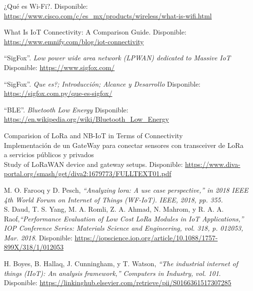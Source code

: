 \begin{references}
    ¿Qué es Wi-Fi?. Disponible:
    \url{https://www.cisco.com/c/es_mx/products/wireless/what-is-wifi.html}

    What Is IoT Connectivity: A Comparison Guide. Disponible:
    \url{https://www.emnify.com/blog/iot-connectivity}

    “SigFox”. \textit{Low power wide area network (LPWAN) dedicated to Massive IoT} Disponible: \url{https://www.sigfox.com/}

    “SigFox”. \textit{Que es?; Introducción; Alcance y Desarrollo} Disponible: \url{https://sigfox.com.py/que-es-sigfox/}

    “BLE”. \textit{Bluetooth Low Energy} Disponible: \url{https://en.wikipedia.org/wiki/Bluetooth_Low_Energy}

    Comparision of LoRa and NB-IoT in Terms of Connectivity\\

    Implementación de un GateWay para conectar sensores con transceiver de LoRa a servicios públicos y privados\\

    Study of LoRaWAN device and gateway setups. Disponible:
    \url{https://www.diva-portal.org/smash/get/diva2:1679773/FULLTEXT01.pdf}

    M. O. Farooq y D. Pesch, \textit{“Analyzing lora: A use case perspective,” in 2018 IEEE 4th World Forum on
    Internet of Things (WF-IoT). IEEE, 2018, pp. 355.}\\

    S. Daud, T. S. Yang, M. A. Romli, Z. A. Ahmad, N. Mahrom, y R. A. A. Raof,\textit{“Performance Evaluation of Low Cost LoRa Modules in IoT Applications,” IOP Conference Series:
    Materials Science and Engineering, vol. 318, p. 012053, Mar. 2018}. Disponible: 
    \url{https://iopscience.iop.org/article/10.1088/1757-899X/318/1/012053}    

    H. Boyes, B. Hallaq, J. Cunningham, y T. Watson, \textit{“The industrial internet of things (IIoT): An
    analysis framework,” Computers in Industry, vol. 101}. Disponible: 
    \url{https://linkinghub.elsevier.com/retrieve/pii/S0166361517307285}  
    


\end{references}
